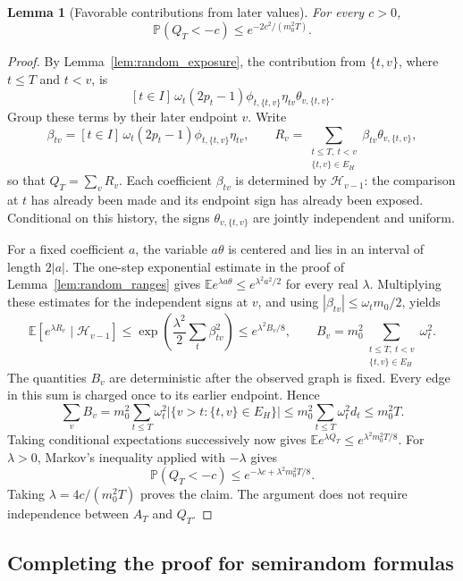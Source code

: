 \documentclass[11pt,a4paper]{article}
\newtheorem{lemma}[theorem]{Lemma}
\theoremstyle{definition}
\theoremstyle{remark}
\newcommand{\E}{\mathbb E}
\newcommand{\Prb}{\mathbb P}
\begin{document}
\begin{lemma}[Favorable contributions from later values]\label{lem:random_compensation}
For every $c>0$,
\[
 \Prb(Q_T<-c)\le e^{-2c^2/(m_0^2T)}.
\]
\end{lemma}
\begin{proof}
By Lemma~\ref{lem:random_exposure}, the contribution from $\{t,v\}$,
where $t\le T$ and $t<v$, is
\[
 [t\in I]\,\omega_t(2p_t-1)
      \phi_{t,\{t,v\}}\eta_{tv}\theta_{v,\{t,v\}}.
\]
Group these terms by their later endpoint $v$. Write
\[
 \beta_{tv}=[t\in I]\,\omega_t(2p_t-1)\phi_{t,\{t,v\}}\eta_{tv},
 \qquad
 R_v=\sum_{\substack{t\le T,\ t<v\\\{t,v\}\in E_H}}
          \beta_{tv}\theta_{v,\{t,v\}},
\]
so that $Q_T=\sum_v R_v$. Each coefficient $\beta_{tv}$ is determined by
$\mathcal H_{v-1}$: the comparison at $t$ has already been made and its
endpoint sign has already been exposed. Conditional on this history,
the signs $\theta_{v,\{t,v\}}$ are jointly independent and uniform.

For a fixed coefficient $a$, the variable $a\theta$ is centered and
lies in an interval of length $2|a|$. The one-step exponential estimate
in the proof of Lemma~\ref{lem:random_ranges} gives
$\E e^{\lambda a\theta}\le e^{\lambda^2a^2/2}$ for every real
$\lambda$. Multiplying these estimates for the independent signs at
$v$, and using $|\beta_{tv}|\le\omega_t m_0/2$, yields
\[
 \E[e^{\lambda R_v}\mid\mathcal H_{v-1}]
 \le \exp\left(\frac{\lambda^2}{2}\sum_t \beta_{tv}^2\right)
 \le e^{\lambda^2 B_v/8},
 \qquad
 B_v=m_0^2\sum_{\substack{t\le T,\ t<v\\\{t,v\}\in E_H}}\omega_t^2.
\]
The quantities $B_v$ are deterministic after the observed graph is fixed.
Every edge in this sum is charged once to its earlier endpoint. Hence
\[
 \sum_v B_v
 =m_0^2\sum_{t\le T}\omega_t^2
        |\{v>t:\{t,v\}\in E_H\}|
 \le m_0^2\sum_{t\le T}\omega_t^2d_t
 \le m_0^2T.
\]
Taking conditional expectations successively now gives
$\E e^{\lambda Q_T}\le e^{\lambda^2m_0^2T/8}$.
For $\lambda>0$, Markov's inequality applied with $-\lambda$ gives
\[
 \Prb(Q_T<-c)\le e^{-\lambda c+\lambda^2m_0^2T/8}.
\]
Taking $\lambda=4c/(m_0^2T)$ proves the claim. The argument does not
require independence between $A_T$ and $Q_T$.
\end{proof}

\subsection{Completing the proof for semirandom formulas}\label{app:random_main_completion}
\end{document}
